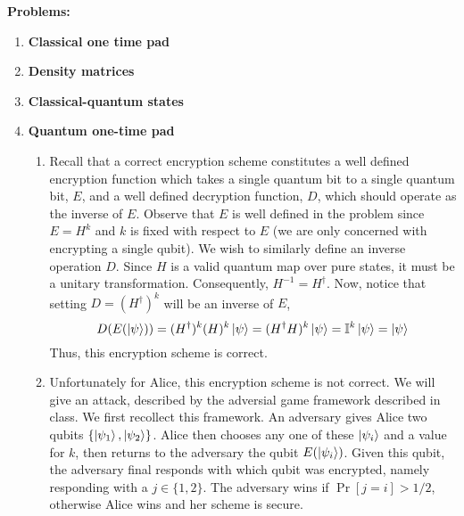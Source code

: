 \documentclass[12pt]{article}
\begin{document}
 
\medskip
{\bf Problems:}
\begin{enumerate}
\item {\bf Classical one time pad}\\


\item {\bf Density matrices}\\



\item {\bf Classical-quantum states}\\


\item {\bf Quantum one-time pad}
\begin{enumerate}
\item
Recall that a correct encryption scheme constitutes a well defined encryption function which takes a single quantum bit to a single quantum bit, $E$, and a well defined decryption function, $D$, which should operate as the inverse of $E$. Observe that $E$ is well defined in the problem since $E = H^k$ and $k$ is fixed with respect to $E$ (we are only concerned with encrypting a single qubit). We wish to similarly define an inverse operation $D$. Since $H$ is a valid quantum map over pure states, it must be a unitary transformation. Consequently, $H^{-1} = H^\dagger$. Now, notice that setting $D = (H^\dagger)^k$ will be an inverse of $E$,
$$ D(E(\ket{\psi})) = (H^\dagger)^k (H)^k \ket{\psi} = (H^\dagger H)^k \ket{\psi} = \mathbb{I}^k \ket{\psi} = \ket{\psi}$$
Thus, this encryption scheme is correct.
\item
Unfortunately for Alice, this encryption scheme is not correct. We will give an attack, described by the adversial game framework described in class. We first recollect this framework. An adversary gives Alice two qubits $\{\ket{\psi_1},\ket{\psi_2}\}$. Alice then chooses any one of these $\ket{\psi_i}$ and a value for $k$, then returns to the adversary the qubit $E(\ket{\psi_i})$. Given this qubit, the adversary final responds with which qubit was encrypted, namely responding with a $j \in \{1,2\}$. The adversary wins if $\Pr[j =i ] > 1/2$, otherwise Alice wins and her scheme is secure.\\ \\

\end{enumerate}
\end{enumerate}
\end{document}
